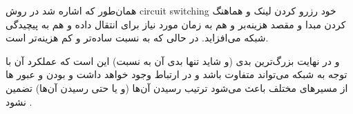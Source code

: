 همان‌طور که اشاره شد در روش circuit switching خود رزرو کردن لینک و هماهنگ کردن مبدا و مقصد هزینه‌بر و هم به زمان مورد نیاز برای انتقال داده و هم به پیچیدگی شبکه می‌افزاید. در حالی که 
به نسبت ساده‌تر و کم هزینه‌تر است.

و در نهایت بزرگ‌‌‌ترین بدی 
(و شاید تنها بدی آن به نسبت)
این است که عملکرد آن با توجه به 
شبکه می‌تواند متفاوت باشد و در ارتباط
وجود خواهد داشت و 
بودن 
و عبور 
ها از مسیرهای مختلف
باعث می‌شود ترتیب رسیدن آن‌ها
(و یا حتی رسیدن آن‌ها)
تضمین نشود
.


